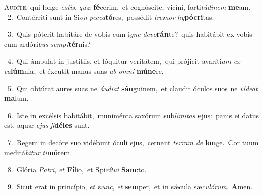 \lettrine{\initial\textcolor{\initialcolor}{A}}{udíte,} qui longe \textit{es}\-\textit{tis}, \textit{quæ} \textbf{fé}\-cerim,~\star et cognóscite, vicíni, forti\-\textit{tú}\-\textit{di}\textit{nem} \textbf{me}\-am.\\
{\numbfont\textcolor{\numbcolor}{~2.}}~Contérriti sunt in Si\textit{on} \textit{pec}\-\textit{ca}\textbf{tó}res,~\star possédit \textit{tre}\-\textit{mor} \textit{hy}\-\textbf{pó}\textbf{cri}tas.\par
{\numbfont\textcolor{\numbcolor}{~3.}}~Quis póterit habitáre de vobis cum i\textit{gne} \textit{de}\-\textit{vo}\textbf{rán}te?~\star quis habitábit ex vobis cum ardóri\textit{bus} \textit{sem}\-\textit{pi}\textbf{tér}nis?\par
{\numbfont\textcolor{\numbcolor}{~4.}}~Qui ámbulat in justítiis, et lóquitur veritátem,~\dagger qui prójicit avaríti\textit{am} \textit{ex} \textit{ca}\-\textbf{lúm}nia,~\star et éxcutit manus suas \textit{ab} \textit{om}\-\textit{ni} \textbf{mú}\-\textbf{ne}re,\par
{\numbfont\textcolor{\numbcolor}{~5.}}~Qui obtúrat aures suas ne \textit{áu}\-\textit{di}\textit{at} \textbf{sán}\-guinem,~\star et claudit óculos suos ne \textit{ví}\-\textit{de}\textit{at} \textbf{ma}\-lum.\par
{\numbfont\textcolor{\numbcolor}{~6.}}~Iste in excélsis habitábit,~\dagger muniménta saxórum sub\-\textit{lí}\-\textit{mi}\textit{tas} \textbf{e}\-jus:~\star panis ei datus est, aquæ \textit{e}\-\textit{jus} \textit{fi}\-\textbf{dé}\textbf{les} sunt.\par
{\numbfont\textcolor{\numbcolor}{~7.}}~Regem in decóre suo vidébunt óculi ejus,~\dagger cernent \textit{ter}\-\textit{ram} \textit{de} \textbf{lon}\-ge.~\star Cor tuum meditá\-\textit{bi}\-\textit{tur} \textit{ti}\-\textbf{mó}rem.\par
{\numbfont\textcolor{\numbcolor}{~8.}}~Glória \textit{Pa}\-\textit{tri}, \textit{et} \textbf{Fí}\-lio,~\star et Spi\-\textit{rí}\-\textit{tu}\textit{i} \textbf{Sanc}\-to.\par
{\numbfont\textcolor{\numbcolor}{~9.}}~Sicut erat in princípio, \textit{et} \textit{nunc}\-, \textit{et} \textbf{sem}\-per,~\star et in sǽcula sæ\-\textit{cu}\-\textit{ló}\textit{rum}. \textbf{A}\-men.\par
